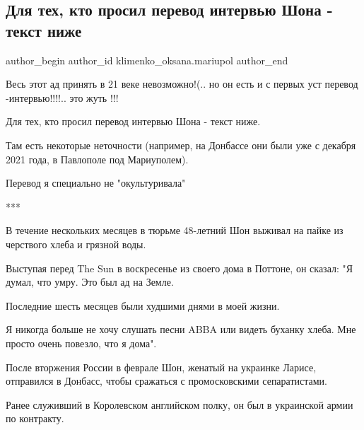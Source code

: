  
 
 
 
 

\subsection{Для тех, кто просил перевод интервью Шона - текст ниже}
\label{sec:30_09_2022.fb.klimenko_oksana.mariupol.1.dlya_tekh__kto_prosi}

\ifcmt
 author_begin
   author_id klimenko_oksana.mariupol
 author_end
\fi

Весь этот ад принять в 21 веке невозможно!(.. но он есть и с первых уст перевод
-интервью!!!!.. это жуть !!!

Для тех, кто просил перевод интервью Шона - текст ниже.

Там есть некоторые неточности (например, на Донбассе они были уже с декабря
2021 года, в Павлополе под Мариуполем).

Перевод я специально не "окультуривала"

***

В течение нескольких месяцев в тюрьме 48-летний Шон выживал на пайке из
черствого хлеба и грязной воды.

Выступая перед The Sun в воскресенье из своего дома в Поттоне, он сказал: "Я
думал, что умру. Это был ад на Земле.

Последние шесть месяцев были худшими днями в моей жизни.

Я никогда больше не хочу слушать песни ABBA или видеть буханку хлеба. Мне
просто очень повезло, что я дома".

После вторжения России в феврале Шон, женатый на украинке Ларисе, отправился в
Донбасс, чтобы сражаться с промосковскими сепаратистами.

Ранее служивший в Королевском английском полку, он был в украинской армии по
контракту.


